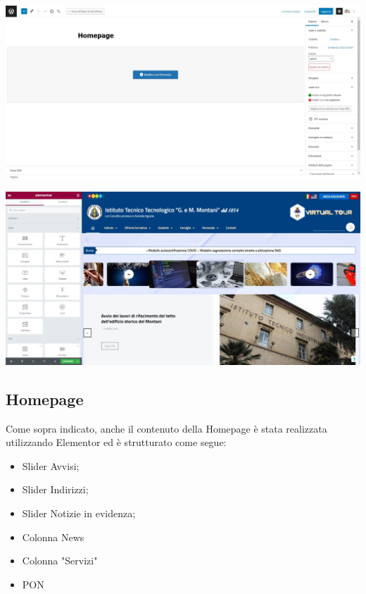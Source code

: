 \documentclass{article}
\begin{document}
	\vspace{0.5 cm}

	\includegraphics[scale=0.18]{Modifica con Elementor.jpeg}

	\vspace{0.5 cm}

	\includegraphics[scale=0.18]{Elementor.jpeg}

	\subsection{\textbf{Homepage}}
	Come sopra indicato, anche il contenuto della Homepage è stata realizzata utilizzando Elementor ed è strutturato come segue:
	\begin{itemize}
		\item Slider Avvisi;
		\item Slider Indirizzi;
		\item Slider Notizie in evidenza;
		\item Colonna News
		\item Colonna "Servizi"
		\item PON
	\end{itemize}	
\end{document}
